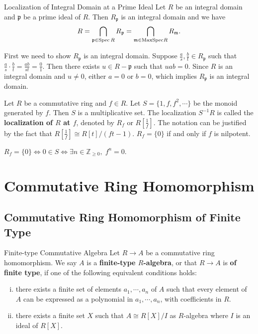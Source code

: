 \begin{proposition}{Localization of Integral Domain at a Prime Ideal}{}
    Let $R$ be an integral domain and $\mathfrak{p}$ be a prime ideal of $R$. Then $R_\mathfrak{p}$ is an integral domain and we have
    \[
    R = \bigcap_{\mathfrak{p}\in \operatorname{Spec} R} R_\mathfrak{p}= \bigcap_{\mathfrak{m}\in \mathrm{MaxSpec} R} R_\mathfrak{m}.
    \]
   
\end{proposition}
\begin{prf}
    First we need to show $R_\mathfrak{p}$ is an integral domain. Suppose $\frac{a}{s},\frac{b}{t}\in R_\mathfrak{p}$ such that $\frac{a}{s}\cdot\frac{b}{t}=\frac{ab}{st}=\frac{0}{1}$. Then there exists $u\in R-\mathfrak{p}$ such that $uab=0$. Since $R$ is an integral domain and $u\ne0$, either $a=0$ or $b=0$, which implies $R_\mathfrak{p}$ is an integral domain.\\
\end{prf}



\begin{example}{}{}
    Let $R$ be a commutative ring and $f\in R$. Let $S=\{1,f,f^2,\cdots\}$ be the monoid generated by $f$. Then $S$ is a multiplicative set. The localization $S^{-1}R$ is called the \textbf{localization of $R$ at $f$}, denoted by $R_f$ or $R\left[\tfrac{1}{f}\right]$. The notation can be justified by the fact that $R\left[\tfrac{1}{f}\right]\cong R\left[t\right]/(ft-1)$.
    $R_f=\{0\}$ if and only if $f$ is nilpotent.
\end{example}

\begin{prf}
    $R_f=\{0\}\iff 0\in S\iff \exists n\in\mathbb{Z}_{\ge0},\;f^n=0$.
\end{prf}

\section{Commutative Ring Homomorphism}

\subsection{Commutative Ring Homomorphism of Finite Type}

\begin{definition}{Finite-type Commutative Algebra}{}
    Let $R\to A$ be a commutative ring homomorphism. We say $A$ is a \textbf{finite-type $R$-algebra}, or that $R\to A$ is \textbf{of finite type}, if one of the following equivalent conditions holds:
    \begin{enumerate}[(i)]
        \item there exists a finite set of elements $a_1,\cdots,a_n$ of $A$ such that every element of $A$ can be expressed as a polynomial in $a_1,\cdots,a_n$, with coefficients in $R$.
        \item there exists a finite set $X$ such that $A\cong R[X]/I$ as $R$-algebra where $I$ is an ideal of $R[X]$.
    \end{enumerate}
    
\end{definition}



